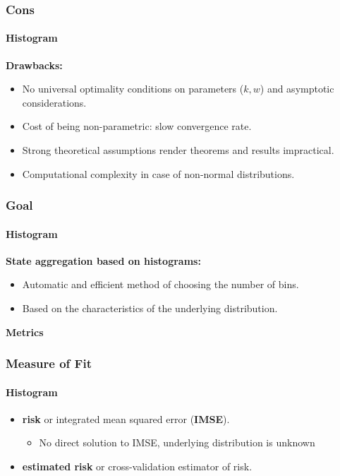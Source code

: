 \documentclass[mathserif]{beamer}
\begin{document}
    \begin{frame}
        \frametitle{Cons}
        \framesubtitle{Histogram}

        {\Large \textbf{Drawbacks:}}
        \begin{itemize}
            \item No universal optimality conditions on parameters ($k, w$) and asymptotic considerations.
            \item Cost of being non-parametric: slow convergence rate.
            \item Strong theoretical assumptions render theorems and results impractical.
            \item Computational complexity in case of non-normal distributions.
        \end{itemize}

    \end{frame}


    \begin{frame}
        \frametitle{Goal}
        \framesubtitle{Histogram}

        {\Large \textbf{State aggregation based on histograms:}}
        \begin{itemize}
            \item Automatic and efficient method of choosing the number of bins.
            \item Based on the characteristics of the underlying distribution.
        \end{itemize}
    \end{frame}

    \vspace{0.3in}

    \begin{frame}
        \Huge \textbf{Metrics}
    \end{frame}


    \begin{frame}
        \frametitle{Measure of Fit}
        \framesubtitle{Histogram}

        \begin{itemize}
            \item \textbf{risk} or integrated mean squared error (\textbf{IMSE}).
            \begin{itemize}
                \item No direct solution to IMSE, underlying distribution is unknown
            \end{itemize}
            \item \textbf{estimated risk} or cross-validation estimator of risk.
        \end{itemize}
    \end{frame}
\end{document}
